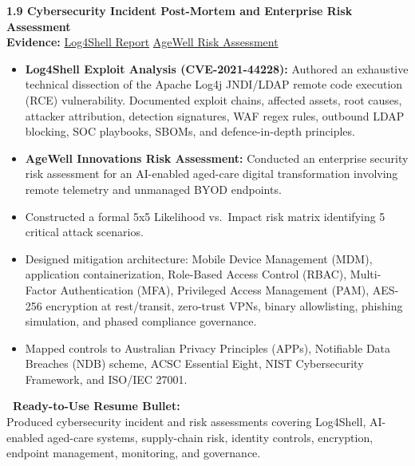 \documentclass[10pt,a4paper]{article}
\newcommand{\statuscompleted}{\tcbox[on line, colback=completedbg, colframe=completed!50!white, size=small, arc=2pt, boxrule=0.5pt]{\scriptsize\bfseries\color{completed}\faIcon{check-circle}\ COMPLETED / SUBSTANTIAL}}
\begin{document}
\begin{projectcard}
  \textbf{\large 1.9 Cybersecurity Incident Post-Mortem and Enterprise Risk Assessment} \hfill \statuscompleted\\[2pt]
  {\footnotesize\color{textmuted}\textbf{Evidence:} \underline{Log4Shell Report} \quad\textbar\quad \underline{AgeWell Risk Assessment}}
  \begin{itemize}[leftmargin=14pt, itemsep=1.5pt, topsep=2pt]
    \item \textbf{Log4Shell Exploit Analysis (CVE-2021-44228):} Authored an exhaustive technical dissection of the Apache Log4j JNDI/LDAP remote code execution (RCE) vulnerability. Documented exploit chains, affected assets, root causes, attacker attribution, detection signatures, WAF regex rules, outbound LDAP blocking, SOC playbooks, SBOMs, and defence-in-depth principles.
    \item \textbf{AgeWell Innovations Risk Assessment:} Conducted an enterprise security risk assessment for an AI-enabled aged-care digital transformation involving remote telemetry and unmanaged BYOD endpoints.
    \item Constructed a formal 5x5 Likelihood vs.\ Impact risk matrix identifying 5 critical attack scenarios.
    \item Designed mitigation architecture: Mobile Device Management (MDM), application containerization, Role-Based Access Control (RBAC), Multi-Factor Authentication (MFA), Privileged Access Management (PAM), AES-256 encryption at rest/transit, zero-trust VPNs, binary allowlisting, phishing simulation, and phased compliance governance.
    \item Mapped controls to Australian Privacy Principles (APPs), Notifiable Data Breaches (NDB) scheme, ACSC Essential Eight, NIST Cybersecurity Framework, and ISO/IEC 27001.
  \end{itemize}
  \begin{resumebox}
    \textbf{\color{accent}\ Ready-to-Use Resume Bullet:}\\
    Produced cybersecurity incident and risk assessments covering Log4Shell, AI-enabled aged-care systems, supply-chain risk, identity controls, encryption, endpoint management, monitoring, and governance.
  \end{resumebox}
\end{projectcard}
\end{document}
